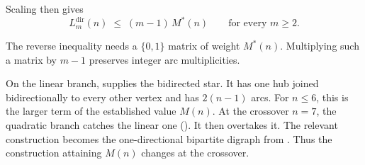 Scaling then gives
\[
    L_m^{\mathrm{dir}}(n) \;\le\; (m - 1)\, M^{*}(n)
    \qquad \text{for every } m \ge 2 .
\]

The reverse inequality needs a $\{0,1\}$ matrix of weight $M^{*}(n)$.
Multiplying such a matrix by $m-1$ preserves integer arc multiplicities.

On the linear branch,  supplies the bidirected star.
It has one hub joined bidirectionally to every other vertex and has $2(n-1)$ arcs.
For $n\le6$, this is the larger term of the established value $M(n)$.
At the crossover $n=7$, the quadratic branch catches the linear one ().
It then overtakes it.
The relevant construction becomes the one-directional bipartite digraph from .
Thus the construction attaining $M(n)$ changes at the crossover.

